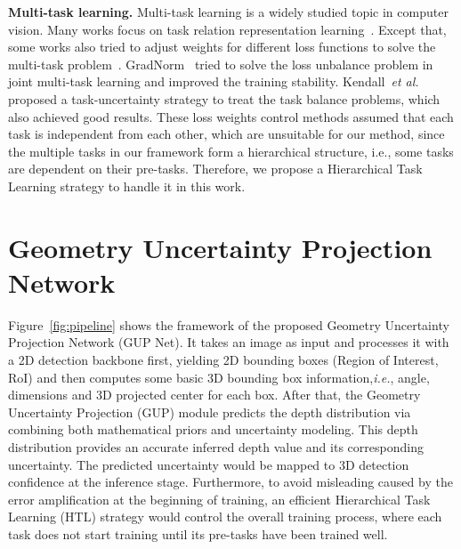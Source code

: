 \documentclass[10pt,twocolumn,letterpaper]{article}
\begin{document}
\noindent \textbf{Multi-task learning.} Multi-task learning is a widely studied topic in computer vision. Many works focus on task relation representation learning~\cite{long2015learning,vandenhende2020mti,xu2018pad,zamir2020robust,zamir2018taskonomy,zhang2019pattern}. Except that, some works also tried to adjust weights for different loss functions to solve the multi-task problem~\cite{chen2018gradnorm,kendall2018multi,zhang2014facial}. 
GradNorm~\cite{chen2018gradnorm} tried to solve the loss unbalance problem in joint multi-task learning and improved the training stability. Kendall~\emph{et al.}~\cite{kendall2018multi} proposed a task-uncertainty strategy to treat the task balance problems, which also achieved good results. These loss weights control methods assumed that each task is independent from each other, which are unsuitable for our method, since the multiple tasks in our framework form a hierarchical structure, i.e., some tasks are dependent on their pre-tasks. Therefore, we propose a Hierarchical Task Learning strategy to handle it in this work.
 \section{Geometry Uncertainty Projection Network}
Figure~\ref{fig:pipeline} shows the framework of the proposed Geometry Uncertainty Projection Network (GUP Net). It takes an image as input and processes it with a 2D detection backbone first, yielding 2D bounding boxes (Region of Interest, RoI) and then computes some basic 3D bounding box information,\textit{i.e.}, angle, dimensions and 3D projected center for each box. After that, the Geometry Uncertainty Projection (GUP) module predicts the depth distribution via combining both mathematical priors and uncertainty modeling. This depth distribution provides an accurate inferred depth value and its corresponding uncertainty. The predicted uncertainty would be mapped to 3D detection confidence at the inference stage. Furthermore, to avoid misleading caused by the error amplification at the beginning of training, an efficient Hierarchical Task Learning (HTL) strategy would control the overall training process, where each task does not start training until its pre-tasks have been trained well. 
\end{document}
